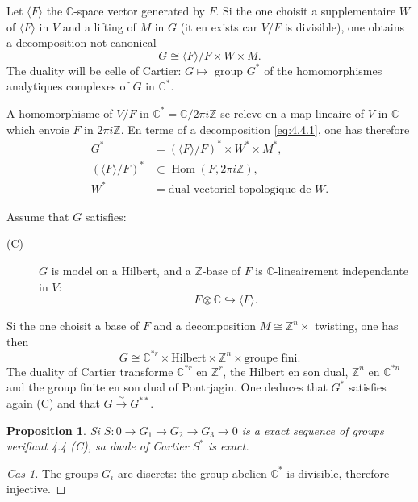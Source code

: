 \documentclass[12pt,a4paper]{article}
\theoremstyle{plain}
\newtheorem{proposition}[theorem]{Proposition}
\theoremstyle{definition}
\theoremstyle{remark}
\DeclareMathOperator{\Hom}{Hom}
\newcommand{\Z}{\mathbb{Z}}
\newcommand{\C}{\mathbb{C}}
\providecommand{\Hom}{\operatorname{Hom}}
\begin{document}
Let $\langle F \rangle$ the $\C$-space vector generated by $F$. Si the one choisit a supplementaire $W$
of $\langle F \rangle$ in $V$ and a lifting of $M$ in $G$ (it en exists car $V/F$ is divisible), one obtains a decomposition not canonical
\begin{equation}\label{eq:4.4.1}
G \cong \langle F \rangle / F \times W \times M.
\end{equation}
The duality will be celle of Cartier: $G \mapsto {}$ group $G^*$ of the homomorphismes analytiques
complexes of $G$ in $\C^*$.

A homomorphisme of $V/F$ in $\C^* = \C/2\pi i\Z$ se releve en a map lineaire
of $V$ in $\C$ which envoie $F$ in $2\pi i\Z$. En terme of a decomposition \eqref{eq:4.4.1}, one has therefore
\begin{align*}
G^* &= (\langle F \rangle / F)^* \times W^* \times M^*, \\
(\langle F \rangle / F)^* &\subset \Hom(F, 2\pi i\Z), \\
W^* &= \text{dual vectoriel topologique de } W.
\end{align*}

Assume that $G$ satisfies:
\begin{description}
\item[(C)] $G$ is model on a Hilbert, and a $\Z$-base of $F$ is $\C$-lineairement independante in $V$:
\[
F \otimes \C \hookrightarrow \langle F \rangle.
\]
\end{description}
Si the one choisit a base of $F$ and a decomposition $M \cong \Z^n \times {}$ twisting, one has then
\begin{equation}\label{eq:4.4.2}
G \cong \C^{*r} \times \text{Hilbert} \times \Z^n \times \text{groupe fini}.
\end{equation}
The duality of Cartier transforme $\C^{*r}$ en $\Z^r$, the Hilbert en son dual, $\Z^n$ en $\C^{*n}$ and the
group finite en son dual of Pontrjagin. One deduces that $G^*$ satisfies again (C) and that
$G \xrightarrow{\sim} G^{**}$.

\begin{proposition}
Si $S : 0 \to G_1 \to G_2 \to G_3 \to 0$ is a exact sequence of groups
verifiant \emph{4.4 (C)}, sa duale of Cartier $S^*$ is exact.
\end{proposition}

\begin{proof}[Cas 1]
The groups $G_i$ are discrets: the group abelien $\C^*$ is divisible, therefore injective.
\end{proof}
\end{document}
